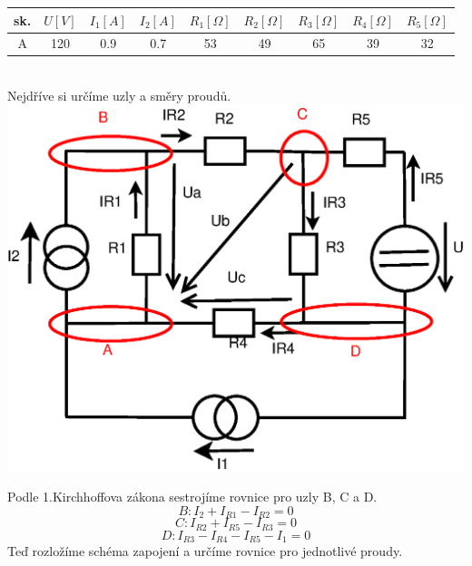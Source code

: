 \documentclass[a4paper, 12pt]{article}
\begin{document}
\begin{tabular}{|c|c|c|c|c|c|c|c|c|}
    \hline
    sk. &$ U[V] $&$ I_1[A] $&$ I_2[A] $&$ R_1[\Omega] $&$ R_2[\Omega] $&$ R_3[\Omega] $&$ R_4[\Omega] $&$ R_5[\Omega] $
    \\ \hline
    A & 120 & 0.9 & 0.7 & 53 & 49 & 65 & 39 & 32
    \\ \hline
\end{tabular}
\\
\vspace{3mm}
Nejdříve si určíme uzly a směry proudů.\\

\includegraphics[scale=0.5]{pr3/cc_02.eps}

Podle 1.Kirchhoffova zákona sestrojíme rovnice pro uzly B, C a D. 
$$ B: I_2 + I_{R1} - I_{R2} = 0 $$
$$ C: I_{R2} + I_{R5} - I_{R3} = 0 $$
$$ D: I_{R3} - I_{R4} - I_{R5} - I_1 = 0 $$
Teď rozložíme schéma zapojení a určíme rovnice pro jednotlivé proudy.
\end{document}
